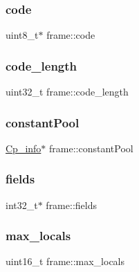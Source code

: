 \hypertarget{structframe_a248713b5b9384b4d3edd365ee82625b4}{}\label{structframe_a248713b5b9384b4d3edd365ee82625b4} 
\subsubsection{\texorpdfstring{code}{code}}
{\footnotesize\ttfamily uint8\+\_\+t$\ast$ frame\+::code}

\hypertarget{structframe_a2a43626ab33a7b6ed584eb7a47fc93e8}{}\label{structframe_a2a43626ab33a7b6ed584eb7a47fc93e8} 
\subsubsection{\texorpdfstring{code\+\_\+length}{code\_length}}
{\footnotesize\ttfamily uint32\+\_\+t frame\+::code\+\_\+length}

\hypertarget{structframe_a40e472a4fefc83b9b6920b4c3d0c3b89}{}\label{structframe_a40e472a4fefc83b9b6920b4c3d0c3b89} 
\subsubsection{\texorpdfstring{constant\+Pool}{constantPool}}
{\footnotesize\ttfamily \hyperlink{struct_cp__info}{Cp\+\_\+info}$\ast$ frame\+::constant\+Pool}

\hypertarget{structframe_abd74d70b2c953c57da3820ef8bfd152f}{}\label{structframe_abd74d70b2c953c57da3820ef8bfd152f} 
\subsubsection{\texorpdfstring{fields}{fields}}
{\footnotesize\ttfamily int32\+\_\+t$\ast$ frame\+::fields}

\hypertarget{structframe_afff6c0343d82c67273a7c92f582f7ba8}{}\label{structframe_afff6c0343d82c67273a7c92f582f7ba8} 
\subsubsection{\texorpdfstring{max\+\_\+locals}{max\_locals}}
{\footnotesize\ttfamily uint16\+\_\+t frame\+::max\+\_\+locals}

